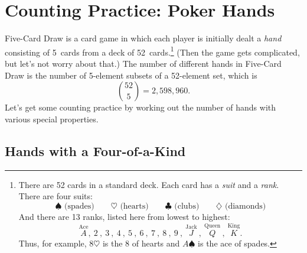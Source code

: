 \begin{problems}


\classproblems
{}

\homeworkproblems
{}

\end{problems}

\section{Counting Practice: Poker Hands}\label{poker_hands_sec}

Five-Card Draw is a card game in which each player is initially dealt
a \emph{hand} consisting of 5~cards from a deck of
52~cards.\footnote{There are 52 cards in a standard deck.  Each card
  has a \emph{suit} and a \emph{rank}.  There are four suits:
%
\[
\spadesuit   \text{ (spades)} \qquad
\heartsuit   \text{ (hearts)} \qquad
\clubsuit    \text{ (clubs)} \qquad
\diamondsuit \text{ (diamonds)}
\]
%
And there are 13 ranks, listed here from lowest to highest:
%
\[
\stackrel{\text{Ace}}{A},\
2\ ,\ 3\ ,\ 4\ ,\ 5\ ,\ 6\ ,\ 7\ ,\ 8\ ,\ 9\ ,\
\stackrel{\text{Jack}}{J}\ ,\
\stackrel{\text{Queen}}{Q}\ ,\
\stackrel{\text{King}}{K}.
\]
%
Thus, for example, $8 \heartsuit$ is the 8 of hearts and $A
\spadesuit$ is the ace of spades.}  (Then the game gets complicated,
but let's not worry about that.)  The number of different hands in
Five-Card Draw is the number of 5-element subsets of a 52-element set,
which is
%
\[
\binom{52}{5} = 2,598,960.
\]
%
Let's get some counting practice by working out the number of hands
with various special properties.

\subsection{Hands with a Four-of-a-Kind}

